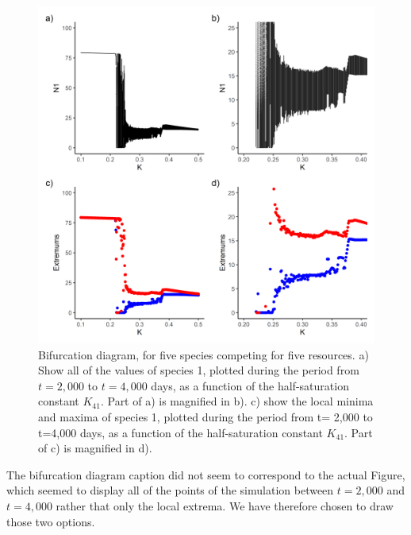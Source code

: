\begin{figure}[H]
\begin{center} 
 \includegraphics[width=1\textwidth]{../Code/Figures/Figure_3.png}
  \caption{Bifurcation diagram, for five species competing for five resources. a) Show all of the values of species 1, plotted during the period from $t=2,000$ to $t=4,000$ days, as a function of the half-saturation constant $K_{41}$. Part of a) is magnified in b). c) show the local minima and maxima of species 1, plotted during the period from t= 2,000 to t=4,000 days, as a function of the half-saturation constant $K_{41}$. Part of c) is magnified in d).}
  \label{figures:Fig3}
\end{center}
\end{figure}

The bifurcation diagram caption did not seem to correspond to the actual Figure, which seemed to display all of the points of the simulation between 
$t=2,000$ and $t=4,000$ rather that only the local extrema. We have therefore chosen to draw those two options. 

